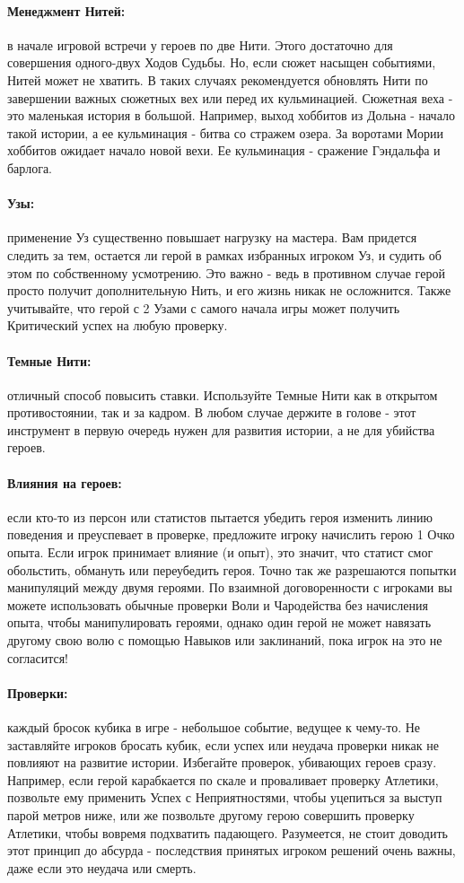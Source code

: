 \paragraph{Менеджмент Нитей:} в начале игровой встречи у героев по две Нити. Этого достаточно для совершения одного-двух Ходов Судьбы. Но, если сюжет насыщен событиями, Нитей может не хватить. В таких случаях рекомендуется обновлять Нити по завершении важных сюжетных вех или перед их кульминацией. Сюжетная веха - это маленькая история в большой. Например, выход хоббитов из Дольна - начало такой истории, а ее кульминация - битва со стражем озера. За воротами Мории хоббитов ожидает начало новой вехи. Ее кульминация - сражение Гэндальфа и барлога.
\paragraph{Узы:} применение Уз существенно повышает нагрузку на мастера. Вам придется следить за тем, остается ли герой в рамках избранных игроком Уз, и судить об этом по собственному усмотрению. Это важно - ведь в противном случае герой просто получит дополнительную Нить, и его жизнь никак не осложнится. Также учитывайте, что герой с 2 Узами с самого начала игры может получить Критический успех на любую проверку.
\paragraph{Темные Нити:} отличный способ повысить ставки. Используйте Темные Нити как в открытом противостоянии, так и за кадром. В любом случае держите в голове - этот инструмент в первую очередь нужен для развития истории, а не для убийства героев.
\paragraph{Влияния на героев:} если кто-то из персон или статистов пытается убедить героя изменить линию поведения и преуспевает в проверке, предложите игроку начислить герою 1 Очко опыта. Если игрок принимает влияние (и опыт), это значит, что статист смог обольстить, обмануть или переубедить героя. Точно так же разрешаются попытки манипуляций между двумя героями. По взаимной договоренности с игроками вы можете использовать обычные проверки Воли и Чародейства без начисления опыта, чтобы манипулировать героями, однако один герой не может навязать другому свою волю с помощью Навыков или заклинаний, пока игрок на это не согласится!
\paragraph{Проверки:} каждый бросок кубика в игре - небольшое событие, ведущее к чему-то. Не заставляйте игроков бросать кубик, если успех или неудача проверки никак не повлияют на развитие истории. Избегайте проверок, убивающих героев сразу. Например, если герой карабкается по скале и проваливает проверку Атлетики, позвольте ему применить Успех с Неприятностями, чтобы уцепиться за выступ парой метров ниже, или же позвольте другому герою совершить проверку Атлетики, чтобы вовремя подхватить падающего. Разумеется, не стоит доводить этот принцип до абсурда - последствия принятых игроком решений очень важны, даже если это неудача или смерть.
